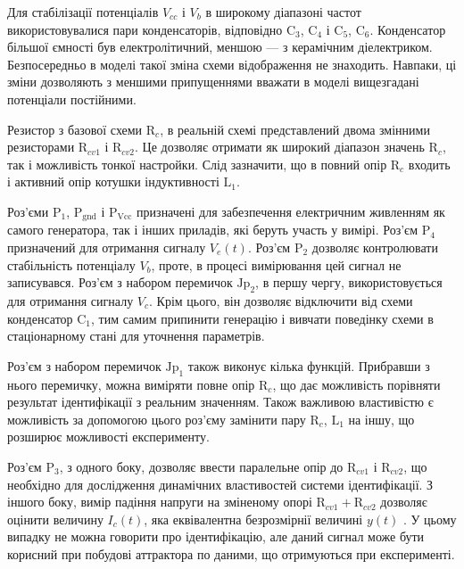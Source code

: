 Для стабілізації потенціалів
$ V_{cc} $ і
$ V_b $ в широкому діапазоні частот використовувалися пари
конденсаторів, відповідно
$ \mathrm{C}_3 $,
$ \mathrm{C}_4 $ і
$ \mathrm{C}_5 $,
$ \mathrm{C}_6 $. Конденсатор більшої ємності був електролітичний,
меншою --- з керамічним діелектриком. Безпосередньо в моделі
такої зміна схеми відображення не знаходить. Навпаки, ці зміни
дозволяють з меншими припущеннями вважати в моделі вищезгадані
потенціали постійними.

Резистор з базової схеми
$ \mathrm{R}_c $, в реальній схемі представлений двома змінними резисторами
$ \mathrm{R}_{cv1} $ і $ \mathrm{R}_{cv2} $.
Це дозволяє отримати як широкий діапазон значень
$ \mathrm{R}_c $, так і можливість тонкої настройки. Слід зазначити,
що в повний опір
$ \mathrm{R}_c $ входить і активний опір котушки індуктивності
$ \mathrm{L}_{1} $.


Роз'єми
$ \mathrm{P}_1 $,
$ \mathrm{P}_\mathrm{gnd} $ і
$ \mathrm{P}_\mathrm{Vcc} $ призначені для забезпечення електричним
живленням як самого генератора, так і інших приладів, які беруть
участь у вимірі. Роз'єм
$ \mathrm{P}_4 $ призначений для отримання сигналу
$ V_e (t) $. Роз'єм
$ \mathrm{P}_2 $ дозволяє контролювати стабільність потенціалу
$ V_b $, проте, в процесі вимірювання цей сигнал не записувався. Роз'єм
з набором перемичок
$ \mathrm{Jp}_2 $, в першу чергу, використовується для отримання сигналу
$ V_c $. Крім цього, він дозволяє відключити від схеми конденсатор
$ \mathrm{C}_1 $, тим самим припинити генерацію і вивчати поведінку
схеми в стаціонарному стані для уточнення параметрів.

Роз'єм з набором перемичок
$ \mathrm{Jp}_1 $ також виконує кілька функцій. Прибравши з нього
перемичку, можна виміряти повне опір
$ \mathrm{R}_{c} $, що дає можливість порівняти результат ідентифікації
з реальним значенням. Також важливою властивістю є можливість
за допомогою цього роз'єму замінити пару
$ \mathrm{R}_{c} $,
$ \mathrm{L}_{1} $ на іншу, що розширює можливості експерименту.


Роз'єм
$ \mathrm{P}_{3} $, з одного боку, дозволяє ввести паралельне опір до
$ \mathrm{R}_{cv1} $ і
$ \mathrm{R}_{cv2} $, що необхідно для дослідження динамічних
властивостей системи ідентифікації. З іншого боку, вимір падіння
напруги на зміненому опорі
$ \mathrm{R}_{cv1} + \mathrm{R}_{cv2} $ дозволяє оцінити величину
$I_c(t) $, яка еквівалентна безрозмірнії величині
$y(t)$ . У цьому випадку не можна говорити про ідентифікацію,
але даний сигнал може бути корисний при побудові аттрактора
по даними, що отримуються при експерименті.



